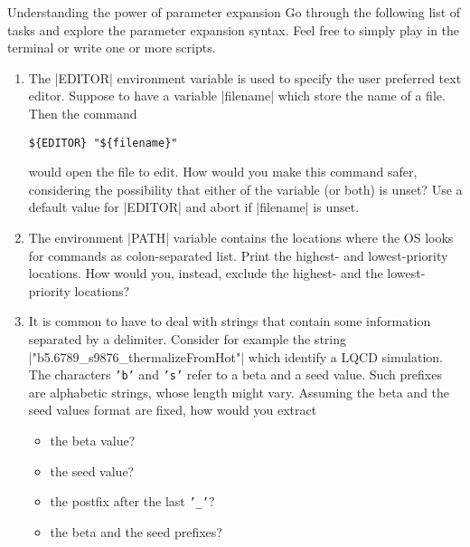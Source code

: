 
\begin{exercise}[Inspirational]{Understanding the power of parameter expansion}
    Go through the following list of tasks and explore the parameter expansion syntax.
    Feel free to simply play in the terminal or write one or more scripts.
    \begin{enumerate}
        \item The \bash|EDITOR| environment variable is used to specify the user preferred text editor.
              Suppose to have a variable \bash|filename| which store the name of a file.
              Then the command
              \begin{lstlisting}[style=MyBash]
                  ${EDITOR} "${filename}"
              \end{lstlisting}
              would open the file to edit.
              How would you make this command safer, considering the possibility that either of the variable (or both) is unset?
              Use a default value for \bash|EDITOR| and abort if \bash|filename| is unset.
        \item The environment \bash|PATH| variable contains the locations where the OS looks for commands as colon-separated list.
              Print the highest- and lowest-priority locations.
              How would you, instead, exclude the highest- and the lowest-priority locations?
        \item It is common to have to deal with strings that contain some information separated by a delimiter.
              Consider for example the string \bash|"b5.6789_s9876_thermalizeFromHot"| which identify a LQCD simulation.
              The characters \texttt{'b'} and \texttt{'s'} refer to a beta and a seed value.
              Such prefixes are alphabetic strings, whose length might vary.
              Assuming the beta and the seed values format are fixed, how would you extract
              \begin{itemize}
                  \item the beta value?
                  \item the seed value?
                  \item the postfix after the last \texttt{'\_'}?
                  \item the beta and the seed prefixes?
              \end{itemize}

\end{enumerate}
\end{exercise}
